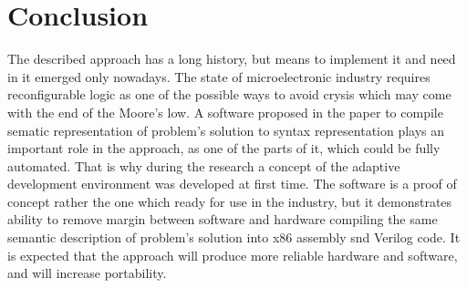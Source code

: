 \section{Conclusion}
The described approach has a long history, but means to implement it and need in it emerged only nowadays. The state of microelectronic industry requires reconfigurable logic as one of the possible ways to avoid crysis which may come with the end of the Moore's low. A software proposed in the paper to compile sematic representation of problem's solution to syntax representation plays an important role in the approach, as one of the parts of it, which could be fully automated. That is why during the research a concept of the adaptive development environment was developed at first time. The software is a proof of concept rather the one which ready for use in the industry, but it demonstrates ability to remove margin between software and hardware compiling the same semantic description of problem's solution into x86 assembly snd Verilog code. It is expected that the approach will produce more reliable hardware and software, and will increase portability.